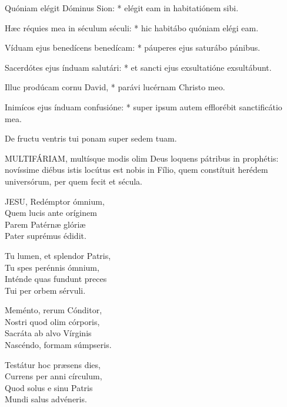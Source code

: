 Quóniam elégit Dóminus Sion: * elégit eam in habitatiónem sibi.

Hæc réquies mea in séculum séculi: * hic habitábo quóniam elégi eam.

Víduam ejus benedícens benedícam: * páuperes ejus saturábo pánibus.

Sacerdótes ejus índuam salutári: * et sancti ejus exsultatióne exsultábunt.

Illuc prodúcam cornu David, * parávi lucérnam Christo meo.

Inimícos ejus índuam confusióne: * super ipsum autem efflorébit sanctificátio mea.

 De fructu ventris tui ponam super sedem tuam.



\lettrine[lines=2]{M}{ULTIFÁRIAM}, multísque modis olim Deus loquens pátribus in prophétis: novíssime diébus istis locútus est nobis in Fílio, quem constítuit herédem universórum, per quem fecit et sécula.


\lettrine[lines=2]{J}{ESU}, Redémptor ómnium,\\
Quem lucis ante oríginem\\
Parem Patérnæ glóriæ\\
Pater suprémus édidit.

Tu lumen, et splendor Patris,\\
Tu spes perénnis ómnium,\\
Inténde quas fundunt preces\\
Tui per orbem sérvuli.

Meménto, rerum Cónditor,\\
Nostri quod olim córporis,\\
Sacráta ab alvo Vírginis\\
Nascéndo, formam súmpseris.

Testátur hoc præsens dies,\\
Currens per anni círculum,\\
Quod solus e sinu Patris\\
Mundi salus advéneris.

